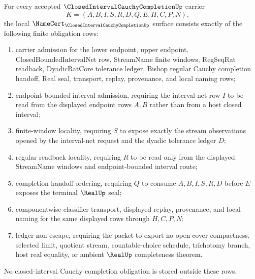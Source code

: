 \begin{theorem}
\label{thm:closed-interval-cauchy-completion-namecert-obligations}
For every accepted $\ClosedIntervalCauchyCompletionUp$ carrier
$$
K=(A,B,I,S,R,D,Q,E,H,C,P,N),
$$
the local $\NameCert_{\ClosedIntervalCauchyCompletionUp}$ surface consists exactly of the following finite obligation rows:
\begin{enumerate}
\item carrier admission for the lower endpoint, upper endpoint, ClosedBoundedIntervalNet row, StreamName finite windows, RegSeqRat readback, DyadicRatCore tolerance ledger, Bishop regular Cauchy completion handoff, Real seal, transport, replay, provenance, and local naming rows;
\item endpoint-bounded interval admission, requiring the interval-net row $I$ to be read from the displayed endpoint rows $A,B$ rather than from a host closed interval;
\item finite-window locality, requiring $S$ to expose exactly the stream observations opened by the interval-net request and the dyadic tolerance ledger $D$;
\item regular readback locality, requiring $R$ to be read only from the displayed StreamName windows and endpoint-bounded interval route;
\item completion handoff ordering, requiring $Q$ to consume $A,B,I,S,R,D$ before $E$ exposes the terminal $\RealUp$ seal;
\item componentwise classifier transport, displayed replay, provenance, and local naming for the same displayed rows through $H,C,P,N$;
\item ledger non-escape, requiring the packet to export no open-cover compactness, selected limit, quotient stream, countable-choice schedule, trichotomy branch, host real equality, or ambient $\RealUp$ completeness theorem.
\end{enumerate}
No closed-interval Cauchy completion obligation is stored outside these rows.
\end{theorem}
